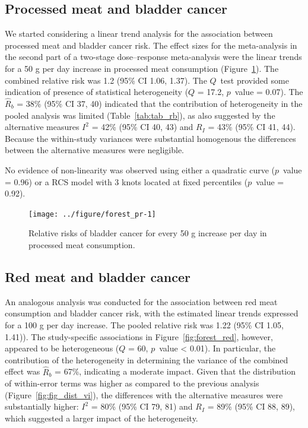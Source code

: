 \documentclass[11pt,a4paper,twoside,openany]{book}\usepackage{knitr}
\begin{document}
{\subsection{Processed meat and bladder cancer}

\noindent We started considering a linear trend analysis for the association between processed meat and bladder cancer risk. The effect sizes for the meta-analysis in the second part of a two-stage dose--response meta-analysis were the linear trends for a 50 g per day increase in processed meat consumption (Figure~\ref{fig:forest_pr}). The combined relative risk was 1.2 (95\% CI 1.06, 1.37). The $Q$~test provided some indication of presence of statistical heterogeneity ($Q $ = 17.2, $p$~value = 0.07). The $\hat R_b$ = 38\% (95\% CI 37, 40) indicated that the contribution of heterogeneity in the pooled analysis was limited (Table~\ref{tab:tab_rb}), as also suggested by the alternative measures $I^2$ = 42\% (95\% CI 40, 43) and $R_I$ = 43\% (95\% CI 41, 44). Because the within-study variances were substantial homogenous the differences between the alternative measures were negligible. 

\noindent No evidence of non-linearity was observed using either a quadratic curve ($p$~value = 0.96) or a RCS model with 3 knots located at fixed percentiles ($p$~value = 0.92).

\begin{knitrout}\footnotesize
{}\color{fgcolor}\begin{figure}[ht!]

{\centering \texttt{[image: ../figure/forest\_pr-1]} 

}

\caption[Relative risks of bladder cancer for every 50 g increase per day in processed meat consumption]{Relative risks of bladder cancer for every 50 g increase per day in processed meat consumption.}\label{fig:forest_pr}
\end{figure}


\end{knitrout}

\subsection{Red meat and bladder cancer}



An analogous analysis was conducted for the association between red meat consumption and bladder cancer risk, with the estimated linear trends expressed for a 100 g per day increase. The pooled relative risk was 1.22 (95\% CI 1.05, 1.41)). The study-specific associations in Figure~\ref{fig:forest_red}, however, appeared to be heterogeneous ($Q $ = 60, $p$~value < 0.01). In particular, the contribution of the heterogeneity in determining the variance of the combined effect was $\hat R_b$ = 67\%, indicating a moderate impact. Given that the distribution of within-error terms was higher as compared to the previous analysis (Figure~\ref{fig:fig_dist_vi}), the differences with the alternative measures were substantially higher: $I^2$ = 80\% (95\% CI 79, 81) and $R_I$ = 89\% (95\% CI 88, 89), which suggested a larger impact of the heterogeneity. 

}
\end{document}
